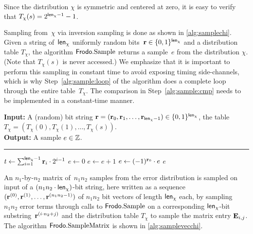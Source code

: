 \documentclass{iacrcc}
\begin{document}
Since the distribution $\chi$ is symmetric and centered at zero, it is easy to verify that
$T_{\chi}(s) = 2^{{\mathsf{len}_{\chi}}-1}-1$.

Sampling from~$\chi$ via inversion sampling is done as shown in
\autoref{alg:samplechi}.  Given a string of~${\mathsf{len}_{\chi}}$ uniformly
random bits~$\mathbf{r} \in \{0,1\}^{{\mathsf{len}_{\chi}}}$ and a distribution table
$T_{\chi}$, the algorithm $\Frodo.\Samp$ returns a sample~$e$ from the
distribution $\chi$. (Note that $T_\chi(s)$ is never accessed.)
We emphasize that it is important to perform
this sampling in constant time to avoid exposing timing side-channels,
which is why Step~\ref{alg:sample:loop} of the algorithm does a complete loop through the
entire table~$T_{\chi}$. The comparison in Step~\ref{alg:sample:cmp} needs
to be implemented in a constant-time manner.

\begin{algorithm}[H]
\caption{\label{alg:samplechi} $\Frodo.\Samp$}
{\bf Input:} A (random) bit string $\mathbf{r} = (\mathbf{r}_0, \mathbf{r}_1, \dots,
\mathbf{r}_{{\mathsf{len}_{\chi}}-1}) \in \{0,1\}^{{\mathsf{len}_{\chi}}}$, the table $T_{\chi} = (T_{\chi}(0), T_{\chi}(1), \dots, T_{\chi}(s))$.\\
{\bf Output:} A sample $e \in \mathbb{Z}$.\\[-1.5ex]
\rule{\linewidth}{.5pt}
\vspace{-0.5cm}
\begin{algorithmic}[1]
    \STATE $t \gets \sum_{i=1}^{{\mathsf{len}_{\chi}}-1} \mathbf{r}_i\cdot 2^{i-1}$
    \STATE $e\gets 0$
    \label{alg:sample:loop}
    \label{alg:sample:cmp}
    \STATE $e\gets e+1$
    \ENDIF
    \ENDFOR
    \STATE $e\gets (-1)^{\mathbf{r}_0}\cdot e$
    \RETURN$e$
\end{algorithmic}
\end{algorithm}

An $n_1$-by-$n_2$ matrix of~$n_1n_2$ samples from the error
distribution is sampled on input of a 
$(n_1n_2 \cdot {\mathsf{len}_{\chi}})$-bit string, here written as a sequence 
$(\mathbf{r}^{(0)}, \mathbf{r}^{(1)}, \dots, \mathbf{r}^{(n_1n_2-1)})$ of
$n_1n_2$ bit vectors of length
${\mathsf{len}_{\chi}}$ each,
by sampling~$n_1n_2$ error terms through calls to $\Frodo.\Samp$ on a
corresponding ${\mathsf{len}_{\chi}}$-bit substring~$\mathbf{r}^{(i\cdot n_2 + j)}$ and
the distribution table $T_\chi$ to sample the matrix entry
$\mathbf{E}_{i,j}$. The algorithm $\textsf{\upshape\mdseries Frodo}.\textrm{\upshape\mdseries SampleMatrix}$ is shown in
\autoref{alg:samplevecchi}.
\end{document}
